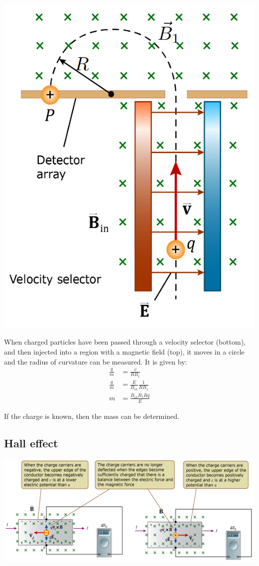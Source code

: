 \documentclass[11pt]{article}
\begin{document}
\begin{center}
\includegraphics[scale=0.9]{./images/mass-spectrometer.png}
\end{center}

When charged particles have been passed through a velocity selector (bottom), and then injected into a region with a magnetic field (top), it moves in a circle and the radius of curvature can be measured. It is given by:
\begin{align*}
\frac{q}{m} &= \frac{v}{RB_1} \\
\frac{q}{m} &= \frac{E}{B_{in}} \frac{1}{RB_1} \\
m &= \frac{B_{in} B_1 Rq}{E}
\end{align*}

If the charge is known, then the mass can be determined.
\subsection{Hall effect}
\label{sec:orga5f55a3}
\begin{center}
\includegraphics[width=.9\linewidth]{./images/hall-effect.png}
\end{center}
\end{document}
